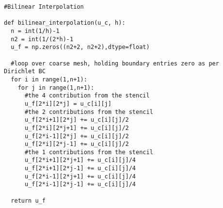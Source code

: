 \documentclass[12pt]{article}
\begin{document}
\begin{verbatim}
#Bilinear Interpolation

def bilinear_interpolation(u_c, h):
  n = int(1/h)-1
  n2 = int(1/(2*h)-1
  u_f = np.zeros((n2+2, n2+2),dtype=float)

  #loop over coarse mesh, holding boundary entries zero as per Dirichlet BC
  for i in range(1,n+1):
    for j in range(1,n+1):
      #the 4 contribution from the stencil
      u_f[2*i][2*j] = u_c[i][j]
      #the 2 contributions from the stencil
      u_f[2*i+1][2*j] += u_c[i][j]/2
      u_f[2*i][2*j+1] += u_c[i][j]/2
      u_f[2*i-1][2*j] += u_c[i][j]/2
      u_f[2*i][2*j-1] += u_c[i][j]/2
      #the 1 contributions from the stencil
      u_f[2*i+1][2*j+1] += u_c[i][j]/4
      u_f[2*i+1][2*j-1] += u_c[i][j]/4
      u_f[2*i-1][2*j+1] += u_c[i][j]/4
      u_f[2*i-1][2*j-1] += u_c[i][j]/4
    
  return u_f
\end{verbatim}
\newpage
\end{document}
